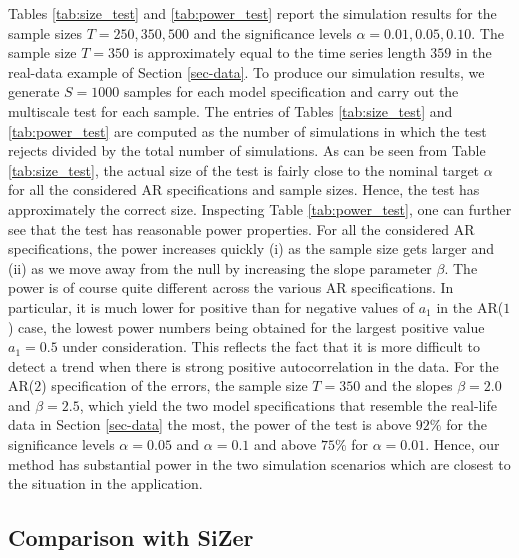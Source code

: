 Tables \ref{tab:size_test} and \ref{tab:power_test} report the simulation results for the sample sizes $T=250,350,500$ and the significance levels $\alpha = 0.01, 0.05, 0.10$. The sample size $T = 350$ is approximately equal to the time series length $359$ in the real-data example of Section \ref{sec-data}. To produce our simulation results, we generate $S=1000$ samples for each model specification and carry out the multiscale test for each sample. The entries of Tables \ref{tab:size_test} and \ref{tab:power_test} are computed as the number of simulations in which the test rejects divided by the total number of simulations. As can be seen from Table \ref{tab:size_test}, the actual size of the test is fairly close to the nominal target $\alpha$ for all the considered AR specifications and sample sizes. Hence, the test has approximately the correct size. Inspecting Table \ref{tab:power_test}, one can further see that the test has reasonable power properties. For all the considered AR specifications, the power increases quickly (i) as the sample size gets larger and (ii) as we move away from the null by increasing the slope parameter $\beta$. The power is of course quite different across the various AR specifications. In particular, it is much lower for positive than for negative values of $a_1$ in the AR($1$) case, the lowest power numbers being obtained for the largest positive value $a_1 = 0.5$ under consideration. This reflects the fact that it is more difficult to detect a trend when there is strong positive autocorrelation in the data. For the AR($2$) specification of the errors, the sample size $T=350$ and the slopes $\beta = 2.0$ and $\beta = 2.5$, which yield the two model specifications that resemble the real-life data in Section \ref{sec-data} the most, the power of the test is above $92\%$ for the significance levels $\alpha = 0.05$ and $\alpha = 0.1$ and above $75\%$ for $\alpha = 0.01$. Hence, our method has substantial power in the two simulation scenarios which are closest to the situation in the application. 


\subsection{Comparison with SiZer}\label{subsec-sim-2}


